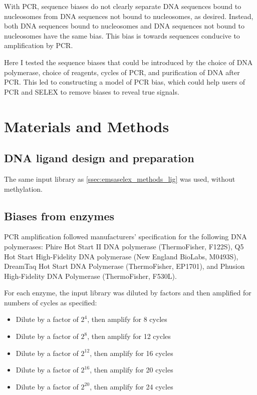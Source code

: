 \documentclass[parskip=full, numbers=noenddot]{scrreprt}
\begin{document}
With PCR, sequence biases do not clearly separate DNA sequences bound to nucleosomes from DNA sequences not bound to nucleosomes, as desired.  Instead, both DNA sequences bound to nucleosomes and DNA sequences not bound to nucleosomes have the same bias.  This bias is towards sequences conducive to amplification by PCR.

Here I tested the sequence biases that could be introduced by the choice of DNA polymerase, choice of reagents, cycles of PCR, and purification of DNA after PCR.  This led to constructing a model of PCR bias, which could help users of PCR and SELEX to remove biases to reveal true signals.


\section{Materials and Methods}
\label{sec:pcrbias_methods}

\subsection{DNA ligand design and preparation}
\label{ssec:pcrbias_methods_lig}

The same input library as \ref{ssec:emsaselex_methods_lig} was used, without methylation.

\subsection{Biases from enzymes}
\label{ssec:pcrbias_methods_enz}

PCR amplification followed manufacturers' specification for the following DNA polymerases: Phire Hot Start II DNA polymerase (ThermoFisher, F122S), Q5 Hot Start High-Fidelity DNA polymerase (New England BioLabs, M0493S), DreamTaq Hot Start DNA Polymerase (ThermoFisher, EP1701), and Phusion High-Fidelity DNA Polymerase (ThermoFisher, F530L).

For each enzyme, the input library was diluted by factors and then amplified for numbers of cycles as specified:

\begin{itemize}
  \item Dilute by a factor of $2^{4}$, then amplify for 8 cycles
  \item Dilute by a factor of $2^{8}$, then amplify for 12 cycles
  \item Dilute by a factor of $2^{12}$, then amplify for 16 cycles
  \item Dilute by a factor of $2^{16}$, then amplify for 20 cycles
  \item Dilute by a factor of $2^{20}$, then amplify for 24 cycles
\end{itemize}
    
\end{document}
